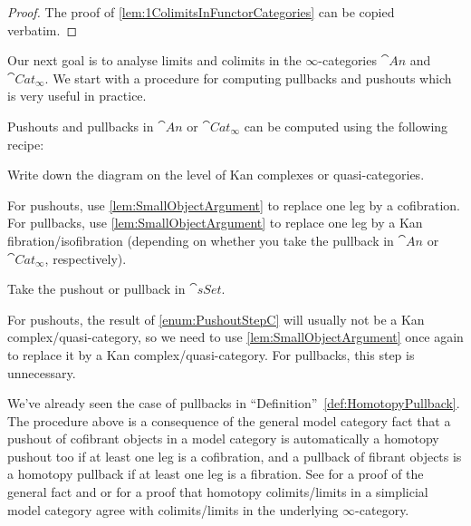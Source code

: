 \begin{proof}
	The proof of \cref{lem:1ColimitsInFunctorCategories} can be copied verbatim.
\end{proof}
Our next goal is to analyse limits and colimits in the $\infty$-categories $\cat{An}$ and $\cat{Cat}_\infty$. We start with a procedure for computing pullbacks and pushouts which is very useful in practice.
\begin{numpar}\label{par:HomotopyPushout}
	Pushouts and pullbacks in $\cat{An}$ or $\cat{Cat}_\infty$ can be computed using the following recipe:
	\begin{alphanumerate}
		\item Write down the diagram on the level of Kan complexes or quasi-categories.\label{enum:PushoutStepA}
		\item For pushouts, use \cref{lem:SmallObjectArgument} to replace one leg by a cofibration. For pullbacks, use \cref{lem:SmallObjectArgument} to replace one leg by a Kan fibration/isofibration (depending on whether you take the pullback in $\cat{An}$ or $\cat{Cat}_\infty$, respectively).\label{enum:PushoutStepB}
		\item Take the pushout or pullback in $\cat{sSet}$.\label{enum:PushoutStepC}
		\item For pushouts, the result of \cref{enum:PushoutStepC} will usually not be a Kan complex/quasi-category, so we need to use \cref{lem:SmallObjectArgument} once again to replace it by a Kan complex/quasi-category. For pullbacks, this step is unnecessary.\label{enum:PushoutStepD}
	\end{alphanumerate}
	We've already seen the case of pullbacks in \enquote{Definition}~\cref{def:HomotopyPullback}. The procedure above is a consequence of the general model category fact that a pushout of cofibrant objects in a model category is automatically a homotopy pushout too if at least one leg is a cofibration, and a pullback of fibrant objects is a homotopy pullback if at least one leg is a fibration. See \cite[Corollary~{\href{https://cisinski.app.uni-regensburg.de/CatLR.pdf\#thm.2.3.28}{2.3.28}}]{Cisinski} for a proof of the general fact and \cite[Theorem~, Remark~]{HTT} or \cite[Theorem~X.21]{HigherCatsII} for a proof that homotopy colimits/limits in a simplicial model category agree with colimits/limits in the underlying $\infty$-category.
	

\end{numpar}

